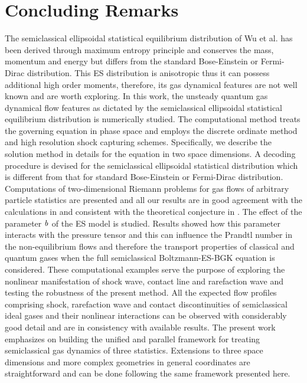 \documentclass{rsproca}%
\begin{document}
\section{Concluding Remarks}
\label{remarks}
The semiclassical ellipsoidal statistical equilibrium distribution of Wu et al. \cite{Wu2012} has been derived through maximum entropy principle and conserves the mass, momentum and energy but differs from the standard Bose-Einstein or Fermi-Dirac distribution. This ES distribution is anisotropic thus it can possess additional high order moments, therefore, its gas dynamical features are not well known and are worth exploring. In this work, the unsteady quantum gas dynamical flow features as dictated by the semiclassical ellipsoidal statistical equilibrium distribution is numerically studied.  The computational method treats the governing equation in phase space and employs the discrete ordinate method and high resolution shock capturing schemes. Specifically, we describe the solution method in details for the equation in two space dimensions.   A decoding procedure is devised for the semiclassical ellipsoidal statistical distribution which is different from that for standard Bose-Einstein or Fermi-Dirac distribution.  Computations of two-dimensional Riemann problems for gas flows of arbitrary particle statistics are presented and all our results are in good agreement with the calculations in \cite{Laxliu95}\cite{schultzrinne} and consistent with the theoretical conjecture in \cite{ZhangZheng90}.  The effect of the parameter $\it{b}$ of the ES model is studied.  Results showed how this parameter interacts with the pressure tensor and this can influence the Prandtl number in the non-equilibrium flows and therefore the transport properties of classical and quantum gases when the full semiclassical Boltzmann-ES-BGK equation is considered. These computational examples serve the purpose of exploring the nonlinear manifestation of shock wave, contact line and rarefaction wave and testing the robustness of the present method. All the expected flow profiles comprising shock, rarefaction wave and contact discontinuities of semiclassical ideal gases and their nonlinear interactions can be observed with considerably good detail and are in consistency with available results. The present work emphasizes on building the unified and parallel framework for treating semiclassical gas dynamics of three statistics. Extensions to three space dimensions and more complex geometries in general coordinates are straightforward and can be done following the same framework presented here.
\end{document}
